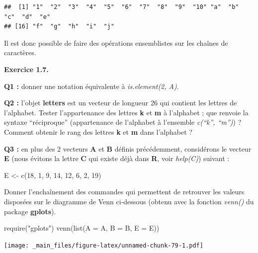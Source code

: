 \documentclass[
]{book}
\newenvironment{Shaded}{\begin{snugshade}}{\end{snugshade}}
\newcommand{\AttributeTok}[1]{\textcolor[rgb]{0.77,0.63,0.00}{#1}}
\newcommand{\DecValTok}[1]{\textcolor[rgb]{0.00,0.00,0.81}{#1}}
\newcommand{\FunctionTok}[1]{\textcolor[rgb]{0.00,0.00,0.00}{#1}}
\newcommand{\NormalTok}[1]{#1}
\newcommand{\OtherTok}[1]{\textcolor[rgb]{0.56,0.35,0.01}{#1}}
\newcommand{\StringTok}[1]{\textcolor[rgb]{0.31,0.60,0.02}{#1}}
\theoremstyle{definition}
\theoremstyle{definition}
\theoremstyle{definition}
\theoremstyle{definition}
\theoremstyle{remark}
\begin{document}
\begin{verbatim}
##  [1] "1"  "2"  "3"  "4"  "5"  "6"  "7"  "8"  "9"  "10" "a"  "b"  "c"  "d"  "e" 
## [16] "f"  "g"  "h"  "i"  "j"
\end{verbatim}

Il est donc possible de faire des opérations ensemblistes sur les chaînes de caractères.

\textbf{Exercice 1.7.}

\textbf{Q1 :} donner une notation équivalente à \emph{is.element(2, A)}.

\textbf{Q2 :} l'objet \textbf{letters} est un vecteur de longueur 26 qui contient les lettres de l'alphabet. Tester l'appartenance des lettres \textbf{k} et \textbf{m} à l'alphabet ; que renvoie la syntaxe ``réciproque'' (appartenance de l'alphabet à l'ensemble \emph{c(``k'', ``m'')}) ? Comment obtenir le rang des lettres \textbf{k} et \textbf{m} dans l'alphabet ?

\textbf{Q3 :} en plus des 2 vecteurs \textbf{A} et \textbf{B} définis précédemment, considérons le vecteur \textbf{E} (nous évitons la lettre \textbf{C} qui existe déjà dans \textbf{R}, voir \emph{help(C)}) suivant :

\begin{Shaded}
\begin{Highlighting}[]
\NormalTok{E }\OtherTok{\textless{}{-}} \FunctionTok{c}\NormalTok{(}\DecValTok{18}\NormalTok{, }\DecValTok{1}\NormalTok{, }\DecValTok{9}\NormalTok{, }\DecValTok{14}\NormalTok{, }\DecValTok{12}\NormalTok{, }\DecValTok{6}\NormalTok{, }\DecValTok{2}\NormalTok{, }\DecValTok{19}\NormalTok{)}
\end{Highlighting}
\end{Shaded}

Donner l'enchaînement des commandes qui permettent de retrouver les valeurs disposées sur le diagramme de Venn ci-dessous (obtenu avec la fonction \emph{venn()} du package \textbf{gplots}).

\begin{Shaded}
\begin{Highlighting}[]
\FunctionTok{require}\NormalTok{(}\StringTok{"gplots"}\NormalTok{)}
\FunctionTok{venn}\NormalTok{(}\FunctionTok{list}\NormalTok{(}\AttributeTok{A =}\NormalTok{ A, }\AttributeTok{B =}\NormalTok{ B, }\AttributeTok{E =}\NormalTok{ E))}
\end{Highlighting}
\end{Shaded}

\texttt{[image: \_main\_files/figure-latex/unnamed-chunk-79-1.pdf]}
\end{document}
